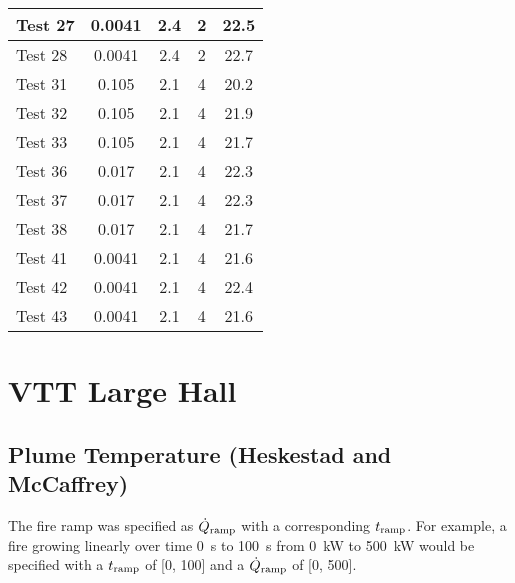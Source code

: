 \begin{table}[!ht]
\begin{center}
\begin{tabular}{|l|c|c|c|c|}
Test 27    &  0.0041           &  2.4       &  2              &  22.5                  \\ \hline
Test 28    &  0.0041           &  2.4       &  2              &  22.7                  \\ \hline
Test 31    &  0.105            &  2.1       &  4              &  20.2                  \\ \hline
Test 32    &  0.105            &  2.1       &  4              &  21.9                  \\ \hline
Test 33    &  0.105            &  2.1       &  4              &  21.7                  \\ \hline
Test 36    &  0.017            &  2.1       &  4              &  22.3                  \\ \hline
Test 37    &  0.017            &  2.1       &  4              &  22.3                  \\ \hline
Test 38    &  0.017            &  2.1       &  4              &  21.7                  \\ \hline
Test 41    &  0.0041           &  2.1       &  4              &  21.6                  \\ \hline
Test 42    &  0.0041           &  2.1       &  4              &  22.4                  \\ \hline
Test 43    &  0.0041           &  2.1       &  4              &  21.6                  \\ \hline
\end{tabular}
\end{center}
\end{table}


\clearpage


\section{VTT Large Hall}

\subsection*{Plume Temperature (Heskestad and McCaffrey)}

The fire ramp was specified as $\dot Q\sb{ramp}$ with a corresponding $t\sb{ramp}$.
For example, a fire growing linearly over time 0~s to 100~s from 0~kW to 500~kW
would be specified with a $t\sb{ramp}$ of [0, 100] and a $\dot Q\sb{ramp}$ of [0, 500].

